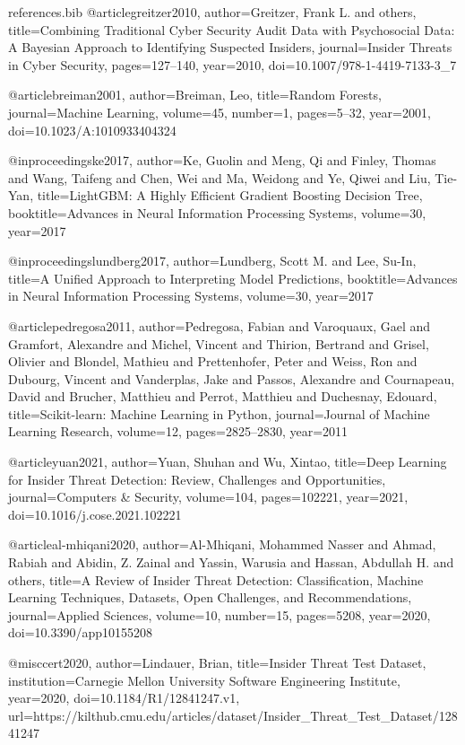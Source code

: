 \begin{filecontents*}{references.bib}
@article{greitzer2010,
  author={Greitzer, Frank L. and others},
  title={Combining Traditional Cyber Security Audit Data with Psychosocial Data: A Bayesian Approach to Identifying Suspected Insiders},
  journal={Insider Threats in Cyber Security},
  pages={127--140},
  year={2010},
  doi={10.1007/978-1-4419-7133-3\_7}}

@article{breiman2001,
  author={Breiman, Leo},
  title={Random Forests},
  journal={Machine Learning},
  volume={45},
  number={1},
  pages={5--32},
  year={2001},
  doi={10.1023/A:1010933404324}}

@inproceedings{ke2017,
  author={Ke, Guolin and Meng, Qi and Finley, Thomas and Wang, Taifeng and Chen, Wei and Ma, Weidong and Ye, Qiwei and Liu, Tie-Yan},
  title={{LightGBM}: A Highly Efficient Gradient Boosting Decision Tree},
  booktitle={Advances in Neural Information Processing Systems},
  volume={30},
  year={2017}}

@inproceedings{lundberg2017,
  author={Lundberg, Scott M. and Lee, Su-In},
  title={A Unified Approach to Interpreting Model Predictions},
  booktitle={Advances in Neural Information Processing Systems},
  volume={30},
  year={2017}}

@article{pedregosa2011,
  author={Pedregosa, Fabian and Varoquaux, Gael and Gramfort, Alexandre and Michel, Vincent and Thirion, Bertrand and Grisel, Olivier and Blondel, Mathieu and Prettenhofer, Peter and Weiss, Ron and Dubourg, Vincent and Vanderplas, Jake and Passos, Alexandre and Cournapeau, David and Brucher, Matthieu and Perrot, Matthieu and Duchesnay, Edouard},
  title={Scikit-learn: Machine Learning in Python},
  journal={Journal of Machine Learning Research},
  volume={12},
  pages={2825--2830},
  year={2011}}

@article{yuan2021,
  author={Yuan, Shuhan and Wu, Xintao},
  title={Deep Learning for Insider Threat Detection: Review, Challenges and Opportunities},
  journal={Computers \& Security},
  volume={104},
  pages={102221},
  year={2021},
  doi={10.1016/j.cose.2021.102221}}

@article{al-mhiqani2020,
  author={Al-Mhiqani, Mohammed Nasser and Ahmad, Rabiah and Abidin, Z. Zainal and Yassin, Warusia and Hassan, Abdullah H. and others},
  title={A Review of Insider Threat Detection: Classification, Machine Learning Techniques, Datasets, Open Challenges, and Recommendations},
  journal={Applied Sciences},
  volume={10},
  number={15},
  pages={5208},
  year={2020},
  doi={10.3390/app10155208}}

@misc{cert2020,
  author={Lindauer, Brian},
  title={Insider Threat Test Dataset},
  institution={Carnegie Mellon University Software Engineering Institute},
  year={2020},
  doi={10.1184/R1/12841247.v1},
  url={https://kilthub.cmu.edu/articles/dataset/Insider_Threat_Test_Dataset/12841247}}


\end{filecontents*}
